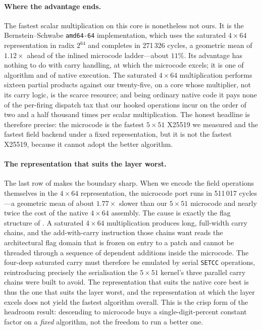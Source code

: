 \paragraph{Where the advantage ends.}
The fastest scalar multiplication on this core is nonetheless not ours. It is the
Bernstein--Schwabe \texttt{amd64-64} implementation, which uses the saturated
$4\times64$ representation in radix $2^{64}$ and completes in 271\,326 cycles, a
geometric mean of $1.12\times$ ahead of the inlined microcode ladder---about
$11\%$. Its advantage has nothing to do with carry handling, at which the
microcode excels; it is one of algorithm and of native execution. The saturated
$4\times64$ multiplication performs sixteen partial products against our
twenty-five, on a core whose multiplier, not its carry logic, is the scarce
resource; and being ordinary native code it pays none of the per-firing dispatch
tax that our hooked operations incur on the order of two and a half thousand times
per scalar multiplication. The honest headline is therefore precise: the microcode
is the fastest \emph{$5\times51$} X25519 we measured and the fastest field backend
under a fixed representation, but it is not the fastest X25519, because it cannot
adopt the better algorithm.

\paragraph{The representation that suits the layer worst.}
The last row of  makes the boundary sharp. When we
encode the field operations themselves in the $4\times64$ representation, the
microcode port runs in 511\,017 cycles---a geometric mean of about $1.77\times$
slower than our $5\times51$ microcode and nearly twice the cost of the native
$4\times64$ assembly. The cause is exactly the flag structure of
. A saturated $4\times64$ multiplication produces long,
full-width carry chains, and the add-with-carry instruction those chains want
reads the architectural flag domain that is frozen on entry to a patch and cannot
be threaded through a sequence of dependent additions inside the microcode. The
four-deep saturated carry must therefore be emulated by serial \texttt{SETCC}
operations, reintroducing precisely the serialisation the $5\times51$ kernel's
three parallel carry chains were built to avoid. The representation that suits the
native core best is thus the one that suits the layer worst, and the
representation at which the layer excels does not yield the fastest algorithm
overall. This is the crisp form of the headroom result: descending to microcode
buys a single-digit-percent constant factor on a \emph{fixed} algorithm, not the
freedom to run a better one.

